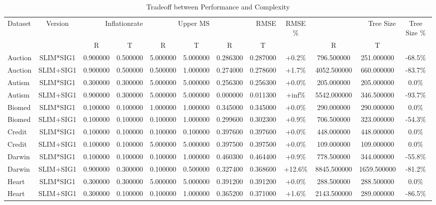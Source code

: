 
    \begin{table}[H]
        \centering
        \renewcommand{\arraystretch}{1.2}
        \caption{Tradeoff between Performance and Complexity}
        \label{tab:inflationrate_tradeoff}
    \begin{tabular}{lccccccccccc}
\toprule
Dataset & Version & \multicolumn{2}{r}{Inflationrate} & \multicolumn{2}{r}{Upper MS} & \multicolumn{2}{r}{RMSE} & RMSE \% & \multicolumn{2}{r}{Tree Size} & Tree Size \% \\
 &  &  R &  T &  R &  T &  R &  T &  &  R &  T &  \\
\midrule
Auction & SLIM*SIG1 & 0.900000 & 0.500000 & 5.000000 & 5.000000 & 0.286300 & 0.287000 & +0.2\% & 796.500000 & 251.000000 & -68.5\% \\
Auction & SLIM+SIG1 & 0.900000 & 0.500000 & 0.500000 & 1.000000 & 0.274000 & 0.278600 & +1.7\% & 4052.500000 & 660.000000 & -83.7\% \\
Autism & SLIM*SIG1 & 0.300000 & 0.300000 & 5.000000 & 5.000000 & 0.256300 & 0.256300 & +0.0\% & 205.000000 & 205.000000 & 0.0\% \\
Autism & SLIM+SIG1 & 0.900000 & 0.300000 & 5.000000 & 5.000000 & 0.000000 & 0.011300 & +inf\% & 5542.000000 & 346.500000 & -93.7\% \\
Biomed & SLIM*SIG1 & 0.100000 & 0.100000 & 1.000000 & 1.000000 & 0.345000 & 0.345000 & +0.0\% & 290.000000 & 290.000000 & 0.0\% \\
Biomed & SLIM+SIG1 & 0.100000 & 0.100000 & 0.100000 & 1.000000 & 0.299600 & 0.302300 & +0.9\% & 706.500000 & 323.000000 & -54.3\% \\
Credit & SLIM*SIG1 & 0.100000 & 0.100000 & 0.100000 & 0.100000 & 0.397600 & 0.397600 & +0.0\% & 448.000000 & 448.000000 & 0.0\% \\
Credit & SLIM+SIG1 & 0.100000 & 0.100000 & 5.000000 & 5.000000 & 0.397500 & 0.397500 & +0.0\% & 109.000000 & 109.000000 & 0.0\% \\
Darwin & SLIM*SIG1 & 0.100000 & 0.100000 & 0.100000 & 1.000000 & 0.460300 & 0.464400 & +0.9\% & 778.500000 & 344.000000 & -55.8\% \\
Darwin & SLIM+SIG1 & 0.900000 & 0.300000 & 0.100000 & 0.500000 & 0.327400 & 0.368600 & +12.6\% & 8845.500000 & 1659.500000 & -81.2\% \\
Heart & SLIM*SIG1 & 0.300000 & 0.300000 & 5.000000 & 5.000000 & 0.391200 & 0.391200 & +0.0\% & 288.500000 & 288.500000 & 0.0\% \\
Heart & SLIM+SIG1 & 0.300000 & 0.100000 & 0.100000 & 1.000000 & 0.365200 & 0.371000 & +1.6\% & 2143.500000 & 289.000000 & -86.5\% \\

\end{tabular}
\end{table}
